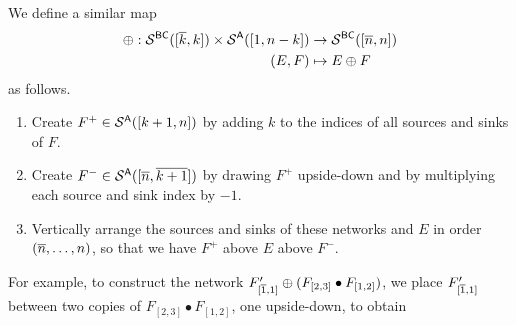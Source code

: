 \documentclass[11pt]{article}
\theoremstyle{definition}
\numberwithin{equation}{section}
\begin{document}
We define a similar map
\begin{equation}\label{eq:oplusnet}
  \begin{aligned}
    \oplus: \snet{BC}{[\ol k,k]} \times \snet{A}{[1,n-k]} &\rightarrow \snet{BC}{[\ol n,n]}\\
      (E,F) &\mapsto E \oplus F
  \end{aligned}
\end{equation}
as follows.
\begin{enumerate}
\item Create $F^+ \in \mathcal S^{\mathsf{A}}([k+1,n])$ by adding $k$ to the
  indices of all sources and sinks of $F$.
\item Create $F^- \in \mathcal S^{\mathsf{A}}([\overline{n}, \overline{k+1}])$ by drawing $F^+$ upside-down
  and by multiplying each source and sink index by $-1$.
\item Vertically arrange the sources and sinks of these networks and $E$
  in order $(\overline{n}, \dotsc, n)$, so that we have $F^+$ above $E$ above $F^-$.
\end{enumerate}
For example, to construct
the network $F'_{[\overline{1},1]} \oplus ( F_{[2,3]} \bullet F_{[1,2]} )$,
we place $F'_{[\overline{1},1]}$ between
two copies of $F_{[2,3]} \bullet F_{[1,2]}$,
one upside-down,
to obtain
\end{document}
